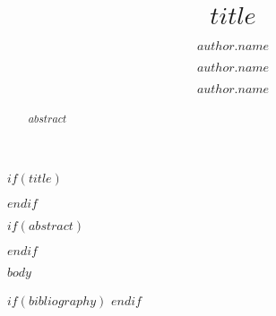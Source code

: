 \documentclass[$if(fontsize)$$fontsize$,$else$11pt, $endif$a4paper]{fisabior}
\title{$title$}
\author[$author.affilnumber$*]{$author.name$}
\author[$author.affilnumber$]{$author.name$}
\author{$author.name$}
\affil[$affil.number$]{$affil.name$}
\affil[*]{\corresponding}
\begin{document}

$if(title)$
\maketitle
$endif$

$if(abstract)$
\begin{abstract}
$abstract$
\end{abstract}
$endif$

$body$

$if(bibliography)$
\printbibliography[title = Referencias Bibliográficas]
$endif$
\end{document}
